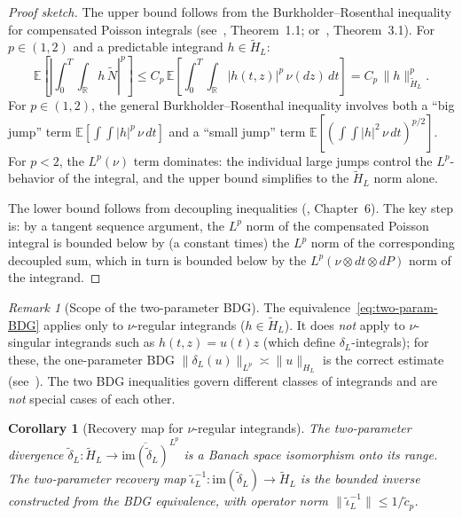 \documentclass[11pt,a4paper]{article}
\theoremstyle{plain}
\newtheorem{corollary}[theorem]{Corollary}
\theoremstyle{definition}
\theoremstyle{remark}
\newtheorem{remark}[theorem]{Remark}
\newcommand{\E}{\mathbb{E}}
\newcommand{\R}{\mathbb{R}}
\newcommand{\im}{\mathrm{im}}
\begin{document}
\begin{proof}[Proof sketch]
The upper bound follows from the Burkholder--Rosenthal
inequality for compensated Poisson integrals
(see~\cite{Dirksen2015}, Theorem~1.1;
or~\cite{MarinelliRockner2014}, Theorem~3.1).
For $p \in (1,2)$ and a predictable integrand
$h \in \widetilde{H}_L$:
\begin{equation}\label{eq:upper-BDG}
  \E\!\left[\left|\int_0^T\!\!\int_{\R}
  h\,\widetilde{N}\right|^p\right]
  \leq C_p\,\E\!\left[\int_0^T\!\!\int_{\R}
  |h(t,z)|^p\,\nu(dz)\,dt\right]
  = C_p\,\|h\|_{\widetilde{H}_L}^p.
\end{equation}
For $p \in (1,2)$, the general Burkholder--Rosenthal
inequality involves both a ``big jump'' term
$\E[\int\!\int|h|^p\,\nu\,dt]$ and a ``small jump'' term
$\E[(\int\!\int|h|^2\,\nu\,dt)^{p/2}]$.
For $p < 2$, the $L^p(\nu)$ term dominates: the individual
large jumps control the $L^p$-behavior of the integral,
and the upper bound simplifies to the
$\widetilde{H}_L$ norm alone.

The lower bound follows from decoupling inequalities
(\cite{delaPenaGine1999}, Chapter~6).  The key step is:
by a tangent sequence argument, the $L^p$ norm of the
compensated Poisson integral is bounded below by
(a constant times) the $L^p$ norm of the corresponding
decoupled sum, which in turn is bounded below by the
$L^p(\nu\otimes dt\otimes dP)$ norm of the integrand.
\end{proof}

\begin{remark}[Scope of the two-parameter BDG]
\label{rem:BDG-scope}
The equivalence~\eqref{eq:two-param-BDG} applies only
to $\nu$-regular integrands ($h \in \widetilde{H}_L$).
It does \emph{not} apply to $\nu$-singular integrands
such as $h(t,z) = u(t)z$ (which define $\delta_L$-integrals);
for these, the one-parameter BDG
$\|\delta_L(u)\|_{L^p} \asymp \|u\|_{H_L}$
is the correct estimate (see~\cite{Fontes2026d}).
The two BDG inequalities govern different classes of
integrands and are \emph{not} special cases of each other.
\end{remark}

\begin{corollary}[Recovery map for $\nu$-regular integrands]
\label{cor:recovery}
The two-parameter divergence
$\widetilde{\delta}_L : \widetilde{H}_L \to
\overline{\im(\widetilde{\delta}_L)}^{L^p}$
is a Banach space isomorphism onto its range.  The
\emph{two-parameter recovery map}
$\widetilde{\iota}_L^{-1} :
\im(\widetilde{\delta}_L)
\to \widetilde{H}_L$ is the bounded inverse
constructed from the BDG equivalence, with operator norm
$\|\widetilde{\iota}_L^{-1}\| \leq 1/\tilde{c}_p$.
\end{corollary}
\end{document}
